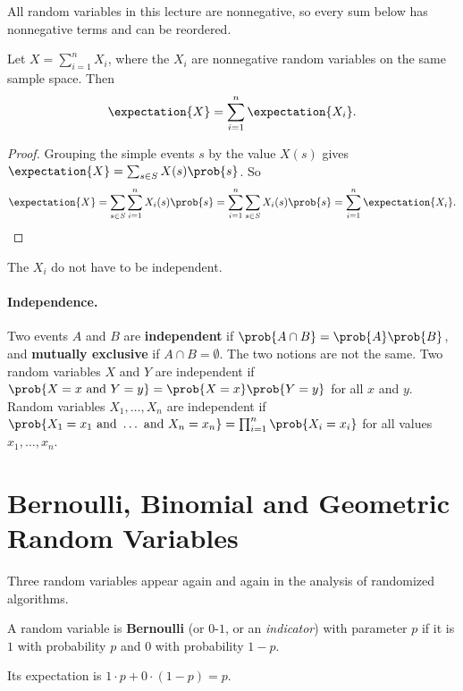 All random variables in this lecture are nonnegative, so every sum below has nonnegative terms and
can be reordered.

\begin{theorem}\label{thm:linearity-0827}
    Let $X = \sum_{i=1}^{n} X_i$, where the $X_i$ are nonnegative random variables on the same
    sample space. Then
    \[\expectation{X} = \sum_{i=1}^{n} \expectation{X_i}.\]
\end{theorem}

\begin{proof}
    Grouping the simple events $s$ by the value $X(s)$ gives
    $\expectation{X} = \sum_{s \in S} X(s) \prob{s}$. So
    \[\expectation{X} = \sum_{s \in S} \sum_{i=1}^{n} X_i(s) \prob{s}
        = \sum_{i=1}^{n} \sum_{s \in S} X_i(s) \prob{s} = \sum_{i=1}^{n} \expectation{X_i}.\]
\end{proof}

The $X_i$ do not have to be independent.

\paragraph{Independence.} Two events $A$ and $B$ are \textbf{independent} if
$\prob{A \cap B} = \prob{A} \prob{B}$, and \textbf{mutually exclusive} if $A \cap B = \emptyset$.
The two notions are not the same. Two random variables $X$ and $Y$ are independent if
$\prob{X = x \text{ and } Y = y} = \prob{X = x} \prob{Y = y}$ for all $x$ and $y$. Random variables
$X_1, \dots, X_n$ are independent if
$\prob{X_1 = x_1 \text{ and } \dots \text{ and } X_n = x_n} = \prod_{i=1}^{n} \prob{X_i = x_i}$ for
all values $x_1, \dots, x_n$.

\section{Bernoulli, Binomial and Geometric Random Variables}

Three random variables appear again and again in the analysis of randomized algorithms.

\begin{definition}\label{def:bernoulli-0827}
    A random variable is \textbf{Bernoulli} (or $0$-$1$, or an \emph{indicator}) with parameter $p$
    if it is $1$ with probability $p$ and $0$ with probability $1 - p$.
\end{definition}

Its expectation is $1 \cdot p + 0 \cdot (1 - p) = p$.

